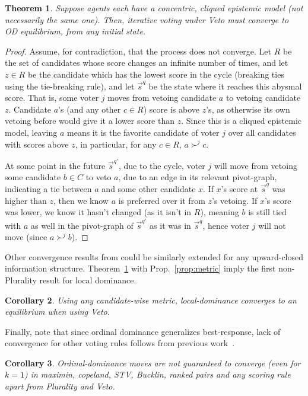 \documentclass[letterpaper]{article} %
\newtheorem{theorem}{Theorem}
\newtheorem{corollary}[theorem]{Corollary}
\begin{document}
\begin{theorem}\label{itConverge}
Suppose agents each have a concentric, cliqued epistemic model (not necessarily the same one). Then, iterative voting under Veto must converge to OD equilibrium, from any initial state.
\end{theorem}
\begin{proof}
Assume, for contradiction, that the process does not converge. Let $R$ be the set of candidates whose score changes an infinite number of times, and let $z\in R$ be the candidate which has the lowest score in the cycle (breaking ties using the tie-breaking rule), and let $\vec{s}^{q}$ be the state where it reaches this abysmal score. That is, some voter $j$ moves from vetoing candidate $a$ to vetoing candidate $z$. Candidate $a$'s (and any other $c\in R$) score is above $z$'s, as otherwise its own vetoing before would give it a lower score than $z$. Since this is a cliqued epistemic model, leaving $a$ means it is the favorite candidate of voter $j$ over all candidates with scores above $z$, in particular, for any $c\in R$, $a\succ^{j}c$.

At some point in the future $\vec{s}^{q'}$, due to the cycle, voter $j$ will move from vetoing some candidate $b\in C$ to veto $a$, due to an edge in its relevant pivot-graph, indicating a tie between $a$ and some other candidate $x$. If $x$'s score at $\vec{s}^{q}$ was higher than $z$, then we know $a$ is preferred over it from $z$'s vetoing. If $x$'s score was lower, we know it hasn't changed (as it isn't in $R$), meaning $b$ is still tied with $a$ as well in the pivot-graph of $\vec{s}^{q'}$ as it was in $\vec{s}^{q}$, hence voter $j$ will not move (since $a\succ^{j}b$).
\end{proof}

Other convergence results from \cite{MLR14} could be similarly extended for any upward-closed information structure.
Theorem~\ref{itConverge} with Prop.~\ref{prop:metric} imply the first non-Plurality result for local dominance.
\begin{corollary}
Using any candidate-wise metric, local-dominance converges to an equilibrium when using Veto.
\end{corollary}

Finally, note that since ordinal dominance generalizes best-response, lack of convergence for other voting rules follows from previous work~\cite{RW12,LR16,KSLR17}.

\begin{corollary}
Ordinal-dominance moves are not guaranteed to converge (even for $k=1$) in maximin, copeland, STV, Bucklin, ranked pairs and any scoring rule apart from Plurality and Veto.
\end{corollary}
\fi
\end{document}
